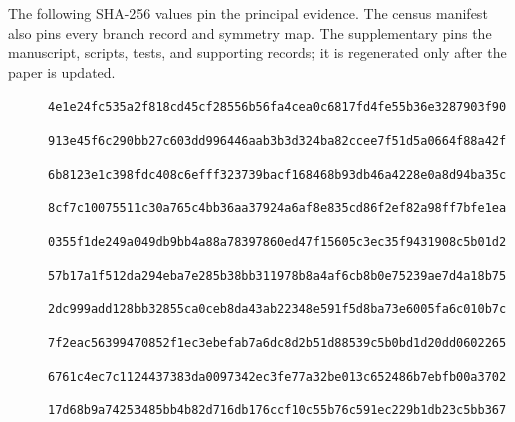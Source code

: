 \documentclass[11pt]{article}
\begin{document}
The following SHA-256 values pin the principal evidence. The census
manifest also pins every branch record and symmetry map. The supplementary
 pins the manuscript, scripts, tests,
and supporting records; it is regenerated only after the paper is updated.
\begin{description}
\item[\normalfont\footnotesize{}] \hfill\break
{\footnotesize\texttt{4e1e24fc535a2f818cd45cf28556b56fa4cea0c6817fd4fe55b36e3287903f90}}
\item[\normalfont\footnotesize{}] \hfill\break
{\footnotesize\texttt{913e45f6c290bb27c603dd996446aab3b3d324ba82ccee7f51d5a0664f88a42f}}
\item[\normalfont\footnotesize{}] \hfill\break
{\footnotesize\texttt{6b8123e1c398fdc408c6efff323739bacf168468b93db46a4228e0a8d94ba35c}}
\item[\normalfont\footnotesize{}] \hfill\break
{\footnotesize\texttt{8cf7c10075511c30a765c4bb36aa37924a6af8e835cd86f2ef82a98ff7bfe1ea}}
\item[\normalfont\footnotesize{}] \hfill\break
{\footnotesize\texttt{0355f1de249a049db9bb4a88a78397860ed47f15605c3ec35f9431908c5b01d2}}
\item[\normalfont\footnotesize{}] \hfill\break
{\footnotesize\texttt{57b17a1f512da294eba7e285b38bb311978b8a4af6cb8b0e75239ae7d4a18b75}}
\item[\normalfont\footnotesize{}] \hfill\break
{\footnotesize\texttt{2dc999add128bb32855ca0ceb8da43ab22348e591f5d8ba73e6005fa6c010b7c}}
\item[\normalfont\footnotesize{}] \hfill\break
{\footnotesize\texttt{7f2eac56399470852f1ec3ebefab7a6dc8d2b51d88539c5b0bd1d20dd0602265}}
\item[\normalfont\footnotesize{}] \hfill\break
{\footnotesize\texttt{6761c4ec7c1124437383da0097342ec3fe77a32be013c652486b7ebfb00a3702}}
\item[\normalfont\footnotesize{}] \hfill\break
{\footnotesize\texttt{17d68b9a74253485bb4b82d716db176ccf10c55b76c591ec229b1db23c5bb367}}
\item[\normalfont\footnotesize{}] \hfill\break

\end{description}
\end{document}
